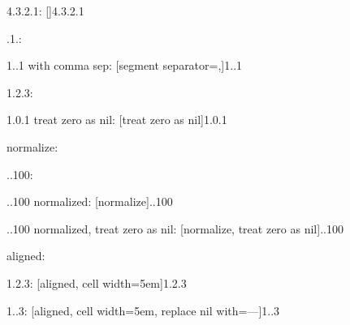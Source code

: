\documentclass{article}
\begin{document}
4.3.2.1: \hfill {}[]{4.3.2.1}

.1.: \hfill {}

1..1 with comma sep: \hfill {}[segment separator={,}]{1..1}

1.2.3: \hfill {}

1.0.1 treat zero as nil: \hfill {}[treat zero as nil]{1.0.1}

normalize:

..100: \hfill {}

..100 normalized: \hfill {}[normalize]{..100}

..100 normalized, treat zero as nil: \hfill {}[normalize, treat zero as nil]{..100}

aligned:

1.2.3: \hfill {}[aligned, cell width=5em]{1.2.3}

1..3: \hfill {}[aligned, cell width=5em, replace nil with={---}]{1..3}
\end{document}

